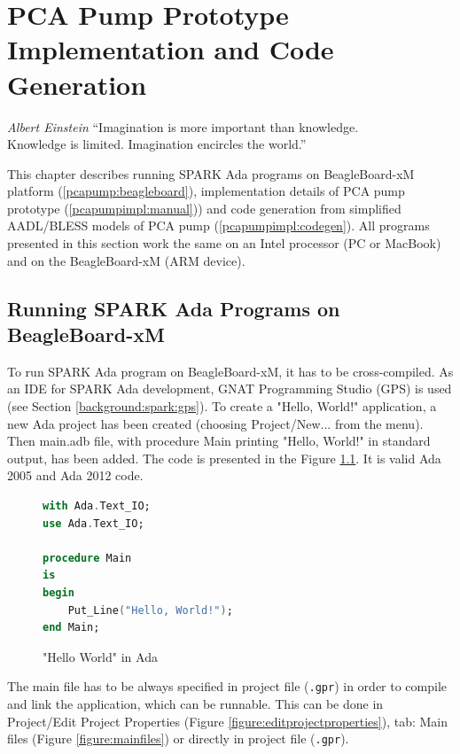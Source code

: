 
\cleardoublepage


\chapter{PCA Pump Prototype Implementation and Code Generation}
\label{pcapumpimpl}

\begin{chapquote}{\textit{Albert Einstein}}
``Imagination is more important than knowledge. \\
Knowledge is limited. Imagination encircles the world.''
\end{chapquote}

This chapter describes running SPARK Ada programs on BeagleBoard-xM platform (\ref{pcapump:beagleboard}), implementation details of PCA pump prototype (\ref{pcapumpimpl:manual})) and code generation from simplified AADL/BLESS models of PCA pump (\ref{pcapumpimpl:codegen}). All programs presented in this section work the same on an Intel processor (PC or MacBook) and on the BeagleBoard-xM (ARM device).


\section{Running SPARK Ada Programs on BeagleBoard-xM}
\label{pcapumpimpl:beagleboard}

To run SPARK Ada program on BeagleBoard-xM, it has to be cross-compiled. As an IDE for SPARK Ada development, GNAT Programming Studio (GPS) is used (see Section \ref{background:spark:gps}). To create a "Hello, World!" application, a new Ada project has been created (choosing Project/New... from the menu). Then main.adb file, with procedure Main printing "Hello, World!" in standard output, has been added. The code is presented in the Figure \ref{listing:HelloWorld}. It is valid Ada 2005 and Ada 2012 code.

\begin{figure}[ht]
\singlespacing
\begin{lstlisting}[language=ada, frame=single, gobble=0]
with Ada.Text_IO;
use Ada.Text_IO;

procedure Main
is
begin
    Put_Line("Hello, World!");    
end Main;
\end{lstlisting} 
\doublespacing
\caption{"Hello World" in Ada}
\label{listing:HelloWorld}
\end{figure}


The main file has to be always specified in project file (\lstinline{.gpr}) in order to compile and link the application, which can be runnable. This can be done in Project/Edit Project Properties (Figure \ref{figure:editprojectproperties}), tab: Main files (Figure \ref{figure:mainfiles}) or directly in project file (\lstinline{.gpr}).

